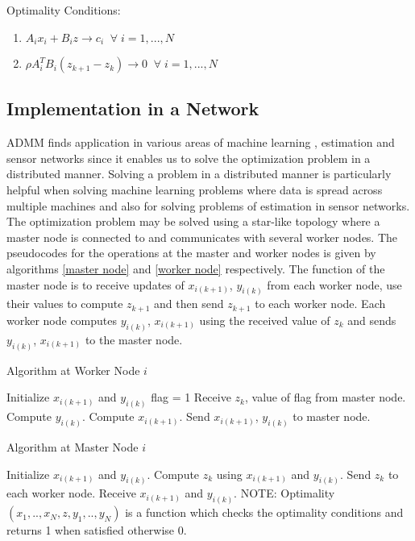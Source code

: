 \documentclass[letterpaper, 10 pt, conference]{ieeeconf}  %
\begin{document}
\noindent 
Optimality Conditions:
\begin{enumerate} \label{optimality conditions}
\item $A_ix_i + B_iz \to c_i \;\; \forall \; i = 1,...,N$
\item $\rho A_i^{T}B_i(z_{k+1} - z_k) \to 0 \;\; \forall \; i = 1,...,N$
\end{enumerate}

\subsection{Implementation in a Network}

ADMM finds application in various areas of machine learning \cite{zhang2012efficient} \cite{gopal2013distributed}, estimation and sensor networks since it enables us to solve the optimization problem in a distributed manner. Solving a problem in a distributed manner is particularly helpful when solving machine learning problems where data is spread across multiple machines and also for solving problems of estimation in sensor networks. The optimization problem may be solved using a star-like topology where a master node is connected to and communicates with several worker nodes. The pseudocodes for the operations at the master and worker nodes is given by algorithms \ref{master node} and \ref{worker node} respectively. The function of the master node is to receive updates of $x_{i(k+1)}$, $y_{i(k)}$ from each worker node, use their values to compute $z_{k+1}$ and then send $z_{k+1}$ to each worker node. Each worker node computes  $y_{i(k)}$, $x_{i(k+1)}$ using the received value of $z_{k}$ and sends $y_{i(k)}$, $x_{i(k+1)}$ to the master node.

\begin{algorithm}
\caption{Algorithm at Worker Node $i$}
\label{worker node}
\begin{algorithmic} 
\State Initialize $x_{i(k+1)}$ and $y_{i(k)}$
\State flag = 1 
\State Receive $z_{k}$, value of flag from master node.
\State Compute $y_{i(k)}$.
\State Compute $x_{i(k+1)}$.
\State Send $x_{i(k+1)}$, $y_{i(k)}$ to master node.
\EndWhile
\end{algorithmic}
\end{algorithm}

\begin{algorithm}
\caption{Algorithm at Master Node $i$}
\label{worker node}
\begin{algorithmic} 
\State Initialize $x_{i(k+1)}$ and $y_{i(k)}$.
\State Compute $z_k$ using $x_{i(k+1)}$ and $y_{i(k)}$.
\State Send $z_k$ to each worker node.
\State Receive $x_{i(k+1)}$ and $y_{i(k)}$.
\EndWhile
\State NOTE: Optimality$(x_1,..,x_N,z,y_1,..,y_N)$ is a function which checks the optimality conditions and returns 1 when satisfied otherwise 0.
\end{algorithmic}
\end{algorithm}
\end{document}
